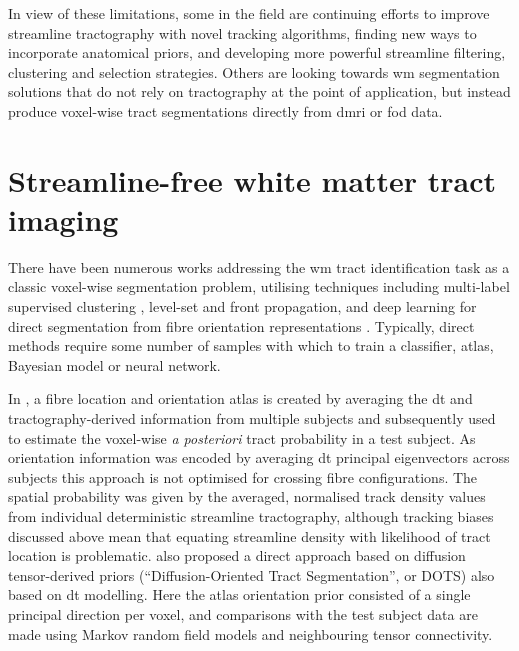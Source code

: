 In view of these limitations, some in the field are continuing efforts to improve streamline tractography with novel tracking algorithms, finding new ways to incorporate anatomical priors, and developing more powerful streamline filtering, clustering and selection strategies.
Others are looking towards \gls{wm} segmentation solutions that do not rely on tractography at the point of application, but instead produce voxel-wise tract segmentations directly from \gls{dmri} or \gls{fod} data.

\section{Streamline-free white matter tract imaging}

There have been numerous works addressing the \gls{wm} tract identification task as a classic voxel-wise segmentation problem, utilising techniques including multi-label supervised clustering \autocite{Ratnarajah2014}, level-set and front propagation\autocite{Nazem-Zadeh2011, Hao2014}, and deep learning for direct segmentation from fibre orientation representations \autocite{Wasserthal2018,Li2020}.
Typically, direct methods require some number of samples with which to train a classifier, atlas, Bayesian model or neural network.

In \textcite{Hagler2009}, a fibre location and orientation atlas is created by averaging the \gls{dt} and tractography-derived information from multiple subjects and subsequently used to estimate the voxel-wise \textit{a posteriori} tract probability in a test subject.
As orientation information was encoded by averaging \gls{dt} principal eigenvectors across subjects this approach is not optimised for crossing fibre configurations.
The spatial probability was given by the averaged, normalised track density values from individual deterministic streamline tractography, although tracking biases discussed above mean that equating streamline density with likelihood of tract location is problematic\autocite{Rheault2019,Smith2013}.
\textcite{Bazin2011} also proposed a direct approach based on diffusion tensor-derived priors (``Diffusion-Oriented Tract Segmentation'', or DOTS) also based on \gls{dt} modelling.
Here the atlas orientation prior consisted of a single principal direction per voxel, and comparisons with the test subject data are made using Markov random field models and neighbouring tensor connectivity.

